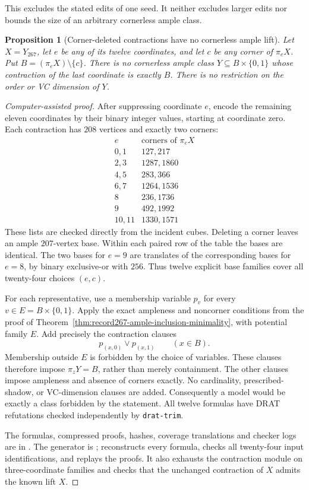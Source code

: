 \documentclass[11pt]{article}
\numberwithin{equation}{section}
\newtheorem{proposition}[theorem]{Proposition}
\theoremstyle{definition}
\theoremstyle{remark}
\begin{document}
This excludes the stated edits of one seed.  It neither excludes larger
edits nor bounds the size of an arbitrary cornerless ample class.

\begin{proposition}[Corner-deleted contractions have no cornerless ample lift]
\label{prop:record-corner-deleted-relifts}
Let $X=Y_{267}$, let $e$ be any of its twelve coordinates, and let $c$
be any corner of $\pi_eX$. Put $B=(\pi_eX)\setminus\{c\}$.
There is no cornerless ample class $Y\subseteq B\times\{0,1\}$ whose
contraction of the last coordinate is exactly $B$.
There is no restriction on the order or VC dimension of $Y$.
\end{proposition}

\begin{proof}[Computer-assisted proof]
After suppressing coordinate $e$, encode the remaining eleven coordinates
by their binary integer values, starting at coordinate zero.
Each contraction has $208$ vertices and exactly two corners:
\[
\begin{array}{c|c}
e&\text{corners of }\pi_eX\\\hline
0,1&127,217\\
2,3&1287,1860\\
4,5&283,366\\
6,7&1264,1536\\
8&236,1736\\
9&492,1992\\
10,11&1330,1571
\end{array}
\]
These lists are checked directly from the incident cubes. Deleting a
corner leaves an ample $207$-vertex base. Within each paired row of the
table the bases are identical. The two bases for $e=9$ are translates
of the corresponding bases for $e=8$, by binary exclusive-or with $256$.
Thus twelve explicit base families cover all twenty-four choices $(e,c)$.

For each representative, use a membership variable $p_v$ for every
$v\in E=B\times\{0,1\}$. Apply the exact ampleness and noncorner
conditions from the proof of
Theorem~\ref{thm:record267-ample-inclusion-minimality}, with potential
family $E$. Add precisely the contraction clauses
\[
 p_{(x,0)}\lor p_{(x,1)}\qquad(x\in B).
\]
Membership outside $E$ is forbidden by the choice of variables. These
clauses therefore impose $\pi_zY=B$, rather than merely containment.
The other clauses impose ampleness and absence of corners exactly.
No cardinality, prescribed-shadow, or VC-dimension clauses are added.
Consequently a model would be exactly a class forbidden by the statement.
All twelve formulas have DRAT refutations checked independently by
\texttt{drat-trim}.

The formulas, compressed proofs, hashes, coverage translations and checker
logs are in .
The generator is ;
 reconstructs every formula,
checks all twenty-four input identifications, and replays the proofs.
It also exhausts the contraction module on three-coordinate families and
checks that the unchanged contraction of $X$ admits the known lift $X$.
\end{proof}
\end{document}
